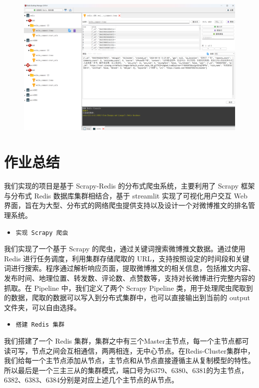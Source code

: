 \documentclass[12pt,hyperref,a4paper,UTF8]{ctexart}
\begin{document}
\begin{figure}[H]
\centering
\includegraphics[width=1\textwidth]{figures/redis-manager.png}
\end{figure}


\newpage
\section{作业总结}

我们实现的项目是基于 Scrapy-Redis 的分布式爬虫系统，主要利用了 Scrapy 框架与分布式 Redis 数据库集群相结合，基于 streamlit 实现了可视化用户交互 Web 界面，旨在为大型、分布式的网络爬虫提供支持以及设计一个对微博推文的排名管理系统。

\begin{itemize}
    \item \texttt{实现 Scrapy 爬虫}
\end{itemize}

我们实现了一个基于 Scrapy 的爬虫，通过关键词搜索微博推文数据。通过使用 Redis 进行任务调度，利用集群存储爬取的 URL，支持按照设定的时间段和关键词进行搜索。程序通过解析响应页面，提取微博推文的相关信息，包括推文内容、发布时间、地理位置、转发数、评论数、点赞数等，支持对长微博进行完整内容的抓取。在 Pipeline 中，我们定义了两个 Scrapy Pipeline 类，用于处理爬虫爬取到的数据，爬取的数据可以写入到分布式集群中，也可以直接输出到当前的 output 文件夹，可以自由选择。

\begin{itemize}
    \item \texttt{搭建 Redis 集群}
\end{itemize}

我们搭建了一个 Redis 集群，集群之中有三个Master主节点，每一个主节点都可读可写，节点之间会互相通信，两两相连，无中心节点。在Redis-Cluster集群中，我们给每一个主节点添加从节点，主节点和从节点直接遵循主从复制模型的特性。所以最后是一个三主三从的集群模式，端口号为6379、6380、6381的为主节点，6382、6383、6384分别是对应上述几个主节点的从节点。
\end{document}
